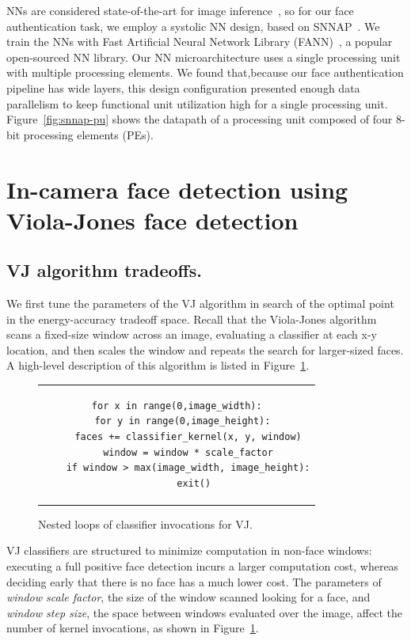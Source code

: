 NNs are considered state-of-the-art for image inference~\cite{amos2016openface}, so for our face authentication task, we employ a systolic NN design, based on SNNAP~\cite{snnap,moreau-bitwidth}.
We train the NNs with Fast Artificial Neural Network Library (FANN)~\cite{fann}, a popular open-sourced NN library.
Our NN microarchitecture uses a single processing unit with multiple processing elements.
We found that,because our face authentication pipeline has wide layers, this design configuration presented enough data parallelism to keep functional unit utilization high for a single processing unit.
Figure~\ref{fig:snnap-pu} shows the datapath of a processing unit composed of four 8-bit processing elements (PEs).

\section{In-camera face detection using Viola-Jones face detection}

\subsection{VJ algorithm tradeoffs.}
We first tune the parameters of the VJ algorithm in search of the optimal point in the energy-accuracy tradeoff space.
Recall that the Viola-Jones algorithm scans a fixed-size window across an image,
evaluating a classifier at each x-y location, and then scales the window and repeats
the search for larger-sized faces.
A high-level description of this algorithm is listed in Figure~\ref{fig:vj-algo}.

\begin{figure}
\begin{tabular}{c}  %
\begin{lstlisting}
for x in range(0,image_width):
  for y in range(0,image_height):
    faces += classifier_kernel(x, y, window)
    window = window * scale_factor
    if window > max(image_width, image_height):
      exit()
\end{lstlisting}
\end{tabular}
\caption{Nested loops of classifier invocations for VJ.}
\label{fig:vj-algo}
\end{figure}


VJ classifiers are structured to minimize computation in non-face windows: executing a full positive face detection incurs a larger computation cost, whereas deciding early that there is no face has a much lower cost.
The parameters of \textit{window scale factor}, the size of the window scanned looking for a face, and \textit{window step size}, the space between windows evaluated over the image, affect the number of kernel invocations, as shown in Figure~\ref{fig:vj-algo}.

